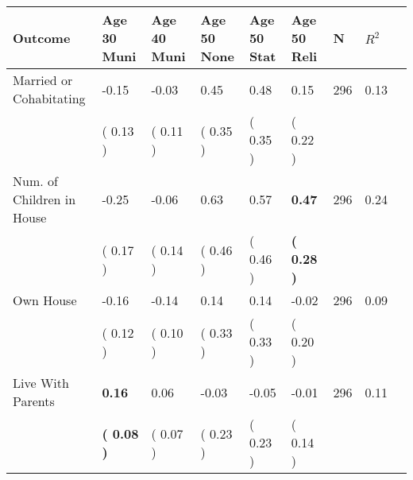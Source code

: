 \begin{tabular}{L{6.2cm} C{1.8cm} C{1.8cm} C{1.8cm} C{1.8cm} C{1.8cm} C{1.8cm} C{0.3cm} C{0.3cm}}
\toprule
 \textbf{Outcome} & \textbf{Age 30 Muni} & \textbf{Age 40 Muni} & \textbf{Age 50 None} & \textbf{Age 50 Stat} & \textbf{Age 50 Reli} & \textbf{N} & \textbf{$ R^2$} \\
\midrule
Married or Cohabitating &     -0.15 &     -0.03 &      0.45 &      0.48 &      0.15  & 296 &       0.13 \\ 
 & (     0.13 ) & (     0.11 ) & (     0.35 ) & (     0.35 ) & (     0.22 )  & \\
Num. of Children in House &     -0.25 &     -0.06 &      0.63 &      0.57 & \textbf{     0.47}  & 296 &       0.24 \\ 
 & (     0.17 ) & (     0.14 ) & (     0.46 ) & (     0.46 ) & \textbf{(     0.28 )}  & \\
Own House &     -0.16 &     -0.14 &      0.14 &      0.14 &     -0.02  & 296 &       0.09 \\ 
 & (     0.12 ) & (     0.10 ) & (     0.33 ) & (     0.33 ) & (     0.20 )  & \\
Live With Parents & \textbf{     0.16} &      0.06 &     -0.03 &     -0.05 &     -0.01  & 296 &       0.11 \\ 
 & \textbf{(     0.08 )} & (     0.07 ) & (     0.23 ) & (     0.23 ) & (     0.14 )  & \\
\bottomrule
\end{tabular}

